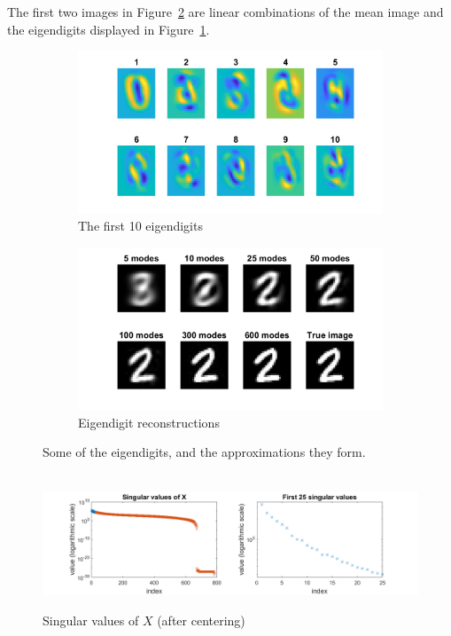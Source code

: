 \documentclass{article}
\begin{document}
The first two images in Figure~\ref{fig:approximations} are linear combinations of the mean image and the eigendigits displayed in Figure~\ref{fig:eigendigits}.
\begin{figure}
	\centering
	\begin{subfigure}{.5\textwidth}
		\centering
		\includegraphics[scale=0.45]{figs/eigendigits}
		\caption{The first 10 eigendigits}    	
		\label{fig:eigendigits}
	\end{subfigure}%
	\begin{subfigure}{.5\textwidth}
		\centering
		\includegraphics[scale=0.45]{figs/approximations}
		\caption{Eigendigit reconstructions}
		\label{fig:approximations}
	\end{subfigure}
	\caption{Some of the eigendigits, and the approximations they form. }
	\label{fig:fig1}
\end{figure}
\begin{figure}
	\centering
	\;\\
	\includegraphics[scale=0.72]{figs/singular_values}
	\caption{Singular values of $X$ (after centering)}
	\label{fig:singular_values}
\end{figure}
\end{document}
